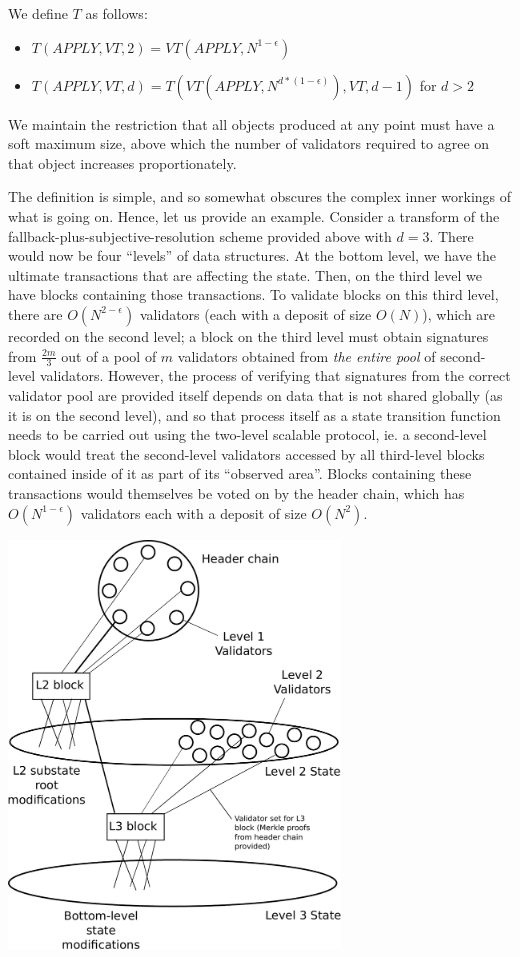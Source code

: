 \documentclass[11pt,a4paper]{report}
\theoremstyle{plain}
\theoremstyle{definition}
\theoremstyle{remark}
\begin{document}
We define $T$ as follows:

\begin{itemize}
\item
$T(APPLY, VT, 2) = VT(APPLY, N^{1-\epsilon})$
\item
$T(APPLY, VT, d) = T(VT(APPLY, N^{d*(1-\epsilon)}), VT, d-1)$ for $d > 2$
\end{itemize}

We maintain the restriction that all objects produced at any point must have a soft maximum size, above which the number of validators required to agree on that object increases proportionately.

The definition is simple, and so somewhat obscures the complex inner workings of what is going on. Hence, let us provide an example. Consider a transform of the fallback-plus-subjective-resolution scheme provided above with $d = 3$. There would now be four ``levels'' of data structures. At the bottom level, we have the ultimate transactions that are affecting the state. Then, on the third level we have blocks containing those transactions. To validate blocks on this third level, there are $O(N^{2-\epsilon})$ validators (each with a deposit of size $O(N)$), which are recorded on the second level; a block on the third level must obtain signatures from $\frac{2m}{3}$ out of a pool of $m$ validators obtained from \emph{the entire pool} of second-level validators. However, the process of verifying that signatures from the correct validator pool are provided itself depends on data that is not shared globally (as it is on the second level), and so that process itself as a state transition function needs to be carried out using the two-level scalable protocol, ie. a second-level block would treat the second-level validators accessed by all third-level blocks contained inside of it as part of its ``observed area''. Blocks containing these transactions would themselves be voted on by the header chain, which has $O(N^{1-\epsilon})$ validators each with a deposit of size $O(N^2)$.

\begin{center}
\includegraphics[width=250pt]{figs/pdfs/multilevel.pdf}
\end{center}
\end{document}
